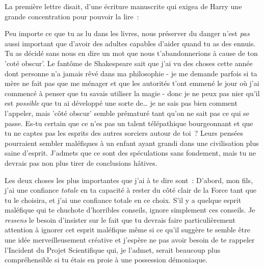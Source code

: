 La première lettre disait, d'une écriture manuscrite qui exigea de Harry une grande concentration pour pouvoir la lire~:
\begin{writtenNote}

Peu importe ce que tu as lu dans les livres, nous préserver du danger n'est \emph{pas} aussi important que d'avoir des adultes capables d'aider quand tu as des ennuis. Tu as décidé sans nous en dire un mot que nous t'abandonnerions à cause de ton 'coté obscur'. Le fantôme de Shakespeare sait que j'ai vu des choses cette année dont personne n'a jamais rêvé dans ma philosophie - je me demande parfois si ta mère ne fait pas que me ménager et que les autorités t'ont emmené le jour où j'ai commencé à penser que tu savais utiliser la magie - donc je ne peux pas nier qu'il est \emph{possible} que tu ai développé une sorte de… je ne sais pas bien comment l'appeler, mais 'côté obscur' semble prématuré tant qu'on ne sait pas ce qui se passe. Es-tu certain que ce n'es pas un talent télépathique bourgeonnant et que tu ne captes pas les esprits des autres sorciers autour de toi~? Leurs pensées pourraient sembler maléfiques à un enfant ayant grandi dans une civilisation plus saine d'esprit. J'admets que ce sont des spéculations sans fondement, mais tu ne devrais pas non plus tirer de conclusions hâtives.

Les deux choses les plus importantes que j'ai à te dire sont~: D'abord, mon fils, j'ai une confiance \emph{totale} en ta capacité à rester du côté clair de la Force tant que tu le choisira, et j'ai une confiance totale en ce choix. S'il y a quelque esprit maléfique qui te chuchote d'horribles conseils, ignore simplement ces conseils. Je \emph{ressens} le besoin d'insister sur le fait que tu devrais faire particulièrement attention à ignorer cet esprit maléfique même si ce qu'il suggère te semble être une idée merveilleusement créative et j'espère ne pas avoir besoin de te rappeler l'Incident du Projet Scientifique qui, je l'admet, serait beaucoup plus compréhensible si tu étais en proie à une possession démoniaque.


\end{writtenNote}
